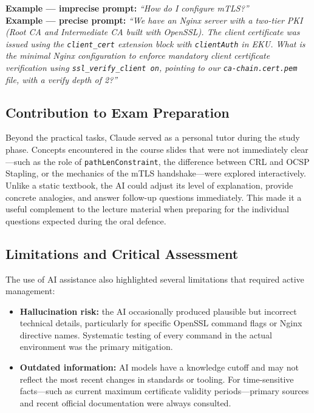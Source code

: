 \documentclass[10pt,twocolumn]{article}
\begin{document}
\begin{infobox}
\footnotesize
\textbf{Example --- imprecise prompt:}
\textit{``How do I configure mTLS?''}\\[4pt]
\textbf{Example --- precise prompt:}
\textit{``We have an Nginx server with a two-tier PKI (Root CA and
Intermediate CA built with OpenSSL). The client certificate was issued
using the \texttt{client\_cert} extension block with
\texttt{clientAuth} in EKU. What is the minimal Nginx configuration
to enforce mandatory client certificate verification using
\texttt{ssl\_verify\_client on}, pointing to our
\texttt{ca-chain.cert.pem} file, with a verify depth of 2?''}
\end{infobox}

\subsection{Contribution to Exam Preparation}

Beyond the practical tasks, Claude served as a personal tutor during the
study phase. Concepts encountered in the course slides that were not
immediately clear---such as the role of \texttt{pathLenConstraint},
the difference between CRL and OCSP Stapling, or the mechanics of the
mTLS handshake---were explored interactively. Unlike a static textbook,
the AI could adjust its level of explanation, provide concrete analogies,
and answer follow-up questions immediately. This made it a useful complement
to the lecture material when preparing for the individual questions expected
during the oral defence.

\subsection{Limitations and Critical Assessment}

The use of AI assistance also highlighted several limitations that required
active management:

\begin{itemize}
  \item \textbf{Hallucination risk:} the AI occasionally produced plausible
        but incorrect technical details, particularly for specific OpenSSL
        command flags or Nginx directive names. Systematic testing of every
        command in the actual environment was the primary mitigation.
  \item \textbf{Outdated information:} AI models have a knowledge cutoff and
        may not reflect the most recent changes in standards or tooling.
        For time-sensitive facts---such as current maximum certificate
        validity periods---primary sources and recent official documentation
        were always consulted.
  
\end{itemize}
\end{document}
